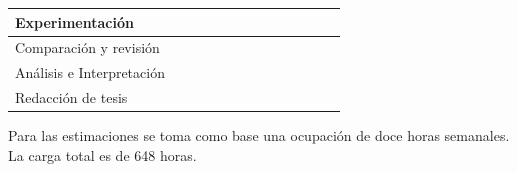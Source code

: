 \documentclass[
    left=2.0cm,         %
    right=2.0cm,        %
    top=2.0cm,          %
    bottom=2.5cm,         %
    bindingoffset=6mm,  %
    nohyphenation=false %
]{eiti/eiti-thesis}
\begin{document}
\begin{table}[h]
\begin{tabular}{|l|l|l|l|l|l|l|l|l|l|l|l|l|}
Experimentación                                &                                                 &                                                 &                          &                          & \cellcolor[HTML]{000000}                        & \cellcolor[HTML]{000000} & \cellcolor[HTML]{000000}                        & \cellcolor[HTML]{000000}                        & \cellcolor[HTML]{000000} &                                                 &                          &                          \\ \hline
Comparación y revisión                         &                                                 &                                                 &                          &                          &                                                 &                          & \cellcolor[HTML]{FFFFFF}{\color[HTML]{000000} } & \cellcolor[HTML]{000000}{\color[HTML]{000000} } & \cellcolor[HTML]{000000} &                                                 &                          &                          \\ \hline
Análisis e Interpretación                      &                                                 &                                                 &                          &                          &                                                 &                          &                                                 &                                                 & \cellcolor[HTML]{000000} & \cellcolor[HTML]{000000}{\color[HTML]{000000} } &                          &                          \\ \hline
Redacción de tesis                             &                                                 &                                                 &                          &                          &                                                 &                          &                                                 &                                                 &                          & \cellcolor[HTML]{000000}{\color[HTML]{000000} } & \cellcolor[HTML]{000000} & \cellcolor[HTML]{000000} \\ \hline
\end{tabular}
\end{table}

Para las estimaciones se toma como base una ocupación de doce horas semanales. La carga total es de 648 horas.
\end{document}
